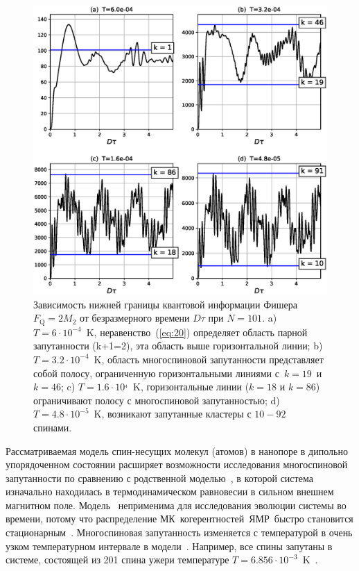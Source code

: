 \documentclass[utf8]{jetp}
\begin{document}
{\begin{figure}
 	\includegraphics[width=0.95\linewidth]{fisher_low_bound_n101.eps}
	\caption{
	  Зависимость нижней границы  квантовой информации Фишера $F_\mathrm{Q} = 2 M_{2}$
	  от безразмерного времени $D\tau$ при $N=101$.
	  a) $T=6\cdot10^{-4}$~K, неравенство~(\ref{eq:20}) определяет область парной запутанности  (k+1=2), эта область выше горизонтальной линии;
	  b) $T=3.2\cdot10^{-4}$~K, область многоспиновой запутанности представляет собой полосу, ограниченную горизонтальными линиями с~$k=19$~и~$k=46$;
	  c) $T = 1.6\cdot10^{_4}$~K, горизонтальные линии ($k=18$ и $k=86$) ограничивают полосу с многоспиновой запутанностью;
	  d) $T=4.8\cdot10^{-5}$~K, возникают запутанные кластеры с $10-92$ спинами.
	}
	\label{fig:2}
\end{figure}

Рассматриваемая модель спин-несущих молекул (атомов) в нанопоре в дипольно упорядоченном состоянии расширяет возможности исследования многоспиновой запутанности по сравнению с родственной моделью~\cite{Doronin_2019},
в которой система изначально находилась в термодинамическом равновесии в сильном внешнем магнитном поле.
Модель~\cite{Doronin_2019} неприменима для исследования эволюции системы во времени,
потому что распределение МК~когерентностей~ЯМР~быстро становится стационарным~\cite{Doronin_2009}.
Многоспиновая запутанность изменяется с температурой в очень узком температурном интервале в модели~\cite{Doronin_2019}.
Например, все спины запутаны в системе, состоящей из 201 спина ужери температуре $T=6.856\cdot10^{-3}$~K~\cite{Doronin_2019}.

}
\end{document}
